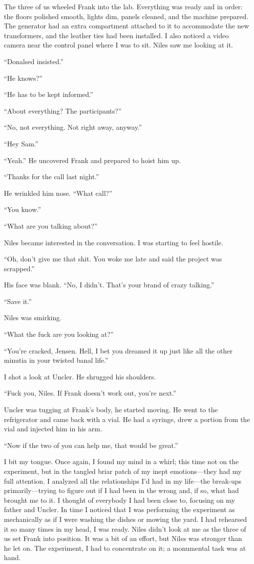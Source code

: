 The three of us wheeled Frank into the lab. Everything was ready and in
order: the floors polished smooth, lights dim, panels cleaned, and the
machine prepared. The generator had an extra compartment attached to it
to accommodate the new transformers, and the leather ties had been
installed. I also noticed a video camera near the control panel where I
was to sit. Niles saw me looking at it.

``Donalsed insisted.''

``He knows?''

``He has to be kept informed.''

``About everything? The participants?''

``No, not everything. Not right away, anyway.''

``Hey Sam.''

``Yeah.'' He uncovered Frank and prepared to hoist him up.

``Thanks for the call last night.''

He wrinkled him nose. ``What call?''

``You know.''

``What are you talking about?''

Niles became interested in the conversation. I was starting to feel
hostile.

``Oh, don't give me that shit. You woke me late and said the project was
scrapped.''

His face was blank. ``No, I didn't. That's your brand of crazy
talking.''

``Save it.''

Niles was smirking.

``What the fuck are you looking at?''

``You're cracked, Jensen. Hell, I bet you dreamed it up just like all
the other minutia in your twisted banal life.''

I shot a look at Uncler. He shrugged his shoulders.

``Fuck you, Niles. If Frank doesn't work out, you're next.''

Uncler was tugging at Frank's body, he started moving. He went to the
refrigerator and came back with a vial. He had a syringe, drew a portion
from the vial and injected him in his arm.

``Now if the two of you can help me, that would be great.''

I bit my tongue. Once again, I found my mind in a whirl; this time not
on the experiment, but in the tangled briar patch of my inept
emotions---they had my full attention. I analyzed all the relationships
I'd had in my life---the break-ups primarily---trying to figure out if I
had been in the wrong and, if so, what had brought me to it. I thought
of everybody I had been close to, focusing on my father and Uncler. In
time I noticed that I was performing the experiment as mechanically as
if I were washing the dishes or mowing the yard. I had rehearsed it so
many times in my head, I was ready. Niles didn't look at me as the three
of us set Frank into position. It was a bit of an effort, but Niles was
stronger than he let on. The experiment, I had to concentrate on it; a
monumental task was at hand.

